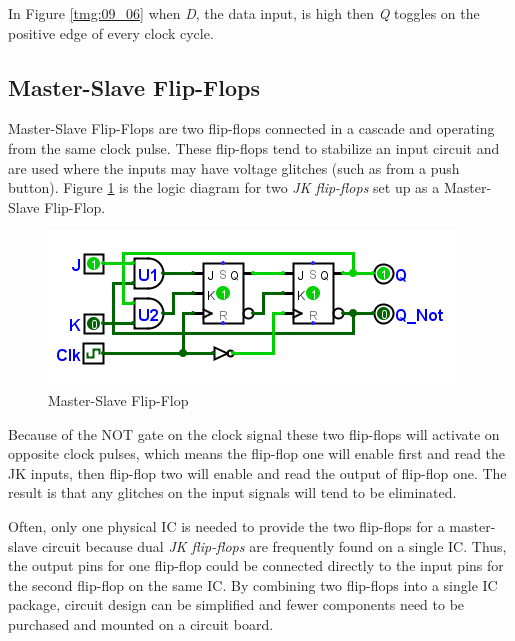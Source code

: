 In Figure \ref{tmg:09_06} when \emph{D}, the data input, is high then \emph{Q} toggles on the positive edge of every clock cycle.

\subsection{Master-Slave Flip-Flops}
\label{SL:subsec:master-slave_flip-flops}

Master-Slave Flip-Flops are two flip-flops connected in a cascade and operating from the same clock pulse. These flip-flops tend to stabilize an input circuit and are used where the inputs may have voltage glitches (such as from a push button). Figure \ref{fig:09_07} is the logic diagram for two \emph{JK flip-flops} set up as a Master-Slave Flip-Flop.

\begin{figure}[H]
	\centering
	\includegraphics[width=\maxwidth{.95\linewidth}]{gfx/09_07}
	\caption{Master-Slave Flip-Flop}
	\label{fig:09_07}
\end{figure}

Because of the \textsf{NOT} gate on the clock signal these two flip-flops will activate on opposite clock pulses, which means the flip-flop one will enable first and read the JK inputs, then flip-flop two will enable and read the output of flip-flop one. The result is that any glitches on the input signals will tend to be eliminated.

Often, only one physical \ac{IC} is needed to provide the two flip-flops for a master-slave circuit because dual \emph{JK flip-flops} are frequently found on a single \ac{IC}. Thus, the output pins for one flip-flop could be connected directly to the input pins for the second flip-flop on the same \ac{IC}. By combining two flip-flops into a single \ac{IC} package, circuit design can be simplified and fewer components need to be purchased and mounted on a circuit board. 

